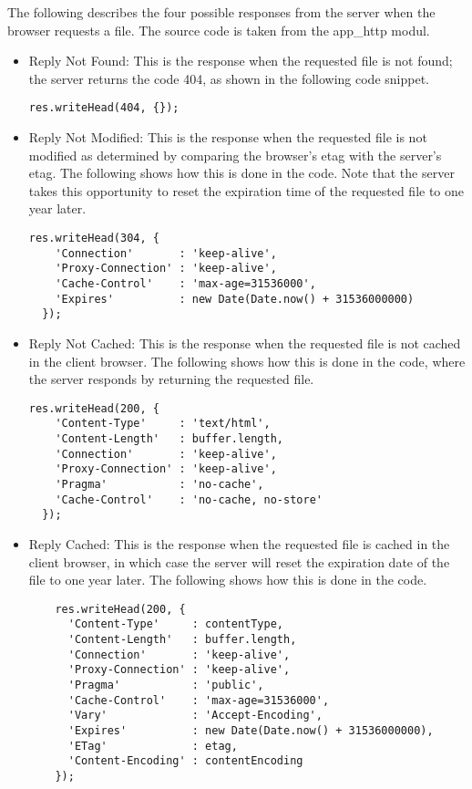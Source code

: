 The following describes the four possible responses from the server when the browser requests a file.  The source code is taken from the app{\_}http modul. 

\begin{itemize}
\item Reply Not Found: This is the response when the requested file is not found; the server returns the code 404, as shown in the following code snippet.

\begin{lstlisting}
res.writeHead(404, {});
\end{lstlisting}

\item Reply Not Modified: This is the response when the requested file is not modified as determined by comparing the browser's etag with the server's etag. The following shows how this is done in the code.  Note that the server takes this opportunity to reset the expiration time of the requested file to one year later. 

\begin{lstlisting}
res.writeHead(304, {
    'Connection'       : 'keep-alive',
    'Proxy-Connection' : 'keep-alive',
    'Cache-Control'    : 'max-age=31536000',
    'Expires'          : new Date(Date.now() + 31536000000)
  });
\end{lstlisting}

\item Reply Not Cached: This is the response when the requested file is not cached in the client browser. The following shows how this is done in the code, where the server responds by returning the requested file.

\begin{lstlisting}
res.writeHead(200, {
    'Content-Type'     : 'text/html',
    'Content-Length'   : buffer.length,
    'Connection'       : 'keep-alive',
    'Proxy-Connection' : 'keep-alive',
    'Pragma'           : 'no-cache',
    'Cache-Control'    : 'no-cache, no-store'
  });
\end{lstlisting}

\item Reply Cached: This is the response when the requested file is cached in the client browser, in which case the server will reset the expiration date of the file to one year later. The following shows how this is done in the code.

\begin{lstlisting}
    res.writeHead(200, {
      'Content-Type'     : contentType,
      'Content-Length'   : buffer.length,
      'Connection'       : 'keep-alive',
      'Proxy-Connection' : 'keep-alive',
      'Pragma'           : 'public',
      'Cache-Control'    : 'max-age=31536000',
      'Vary'             : 'Accept-Encoding',
      'Expires'          : new Date(Date.now() + 31536000000),
      'ETag'             : etag,
      'Content-Encoding' : contentEncoding
    });
\end{lstlisting}

\end{itemize}


